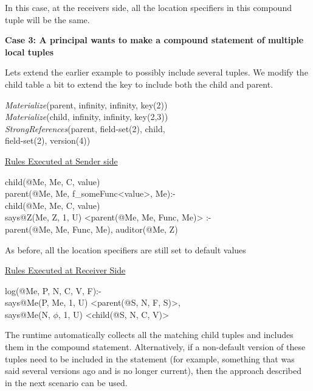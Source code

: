 In this case, at the receivers side, all the location specifiers in this compound tuple will be the same. 

\noindent\textbf{Case 3: A principal wants to make a compound statement of multiple local tuples}

Lets extend the earlier example to possibly include several tuples. We modify the child table a bit to extend the key to include both the child and parent.

\begin{code}
\textit{Materialize}(parent, infinity, infinity, key(2))\\
\textit{Materialize}(child, infinity, infinity, key(2,3))\\
\textit{StrongReferences}(parent, field-set(2), child, \\
\> field-set(2), version(4))
\end{code}

\noindent\underline{Rules Executed at Sender side}

\begin{code}
child(@Me, Me, C, value)\\
parent(@Me, Me, f\_someFunc<value>, Me):- \\
\> child(@Me, Me, C, value)\\
says@Z(Me, Z, 1, U) <parent(@Me, Me, Func, Me)> :- \\
\> parent(@Me, Me,  Func, Me), auditor(@Me, Z)
\end{code}

As before, all the location specifiers are still set to default values

\noindent\underline{Rules Executed at Receiver Side}

\begin{code}
log(@Me, P, N, C, V, F):- \\
\> says@Me(P, Me, 1, U) <parent(@S, N, F, S)>, \\
\> says@Me(N, $\phi$, 1, U) <child(@S, N, C, V)>
\end{code}

The runtime automatically collects all the matching child tuples and includes them in the compound statement. Alternatively, if a non-default version of these tuples need to be included in the statement (for example, something that was said several versions ago and is no longer current), then the approach described in the next scenario can be used.


